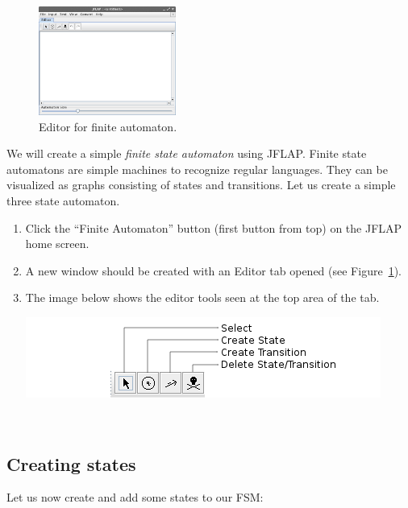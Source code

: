 \documentclass[11pt]{article}
\newcommand{\name}[1]{{\textsf{#1}}}
\newcommand{\jflap}{\name{JFLAP}\xspace}
\begin{document}
\begin{figure}
	\vspace{-20pt}
	\centering
	\includegraphics[width=0.4\textwidth]{img/jflap_fa.png}
	\caption{Editor for finite automaton.}
	\label{fig:editor}
\end{figure}
We will create a simple \emph{finite state automaton} using \jflap. Finite state automatons are simple machines to recognize regular languages. They can be visualized as graphs consisting of states and transitions.
Let us create a simple three state automaton.
%
\begin{enumerate}
  \item Click the ``Finite Automaton'' button (first button from top) on the \jflap home screen.
  \item A new window should be created with an Editor tab opened (see Figure~\ref{fig:editor}).
  \item The image below shows the editor tools seen at the top area of the tab.
  \begin{center}
	   \includegraphics[width=1\linewidth]{img/fa_tools.png}
  \end{center}
\end{enumerate}

\ 
\subsection{Creating states}

Let us now create and add some states to our FSM:
\end{document}
